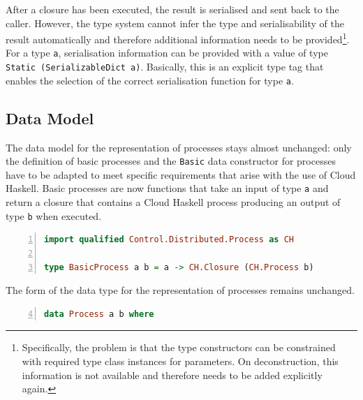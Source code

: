 After a closure has been executed, the result is serialised and sent back to the caller. However, the type system cannot infer the type and serialisability of the result automatically and therefore additional information needs to be provided\footnote{Specifically, the problem is that the type constructors can be constrained with required type class instances for parameters. On deconstruction, this information is not available and therefore needs to be added explicitly again.}. For a type \texttt{a}, serialisation information can be provided with a value of type \texttt{Static (SerializableDict a)}. Basically, this is an explicit type tag that enables the selection of the correct serialisation function for type \texttt{a}.

\subsection{Data Model}
\label{chp:distributed_model}
The data model for the representation of processes stays almost unchanged: only the definition of basic processes and the \texttt{Basic} data constructor for processes have to be adapted to meet specific requirements that arise with the use of \textsf{Cloud Haskell}. Basic processes are now functions that take an input of type \texttt{a} and return a closure that contains a \textsf{Cloud Haskell} process producing an output of type \texttt{b} when executed.
\begin{lstlisting}[language=Haskell,caption=Representation of basic processes as computations in the \texttt{CH.Process} monad.,numbers=left,frame=bt]
import qualified Control.Distributed.Process as CH

type BasicProcess a b = a -> CH.Closure (CH.Process b)
\end{lstlisting}

The form of the data type for the representation of processes remains unchanged.
\begin{lstlisting}[language=Haskell,caption=Data type for the representation of processes.,label=lst:distributed_datatypes,numbers=left,frame=bt,firstnumber=4]
data Process a b where
\end{lstlisting}

